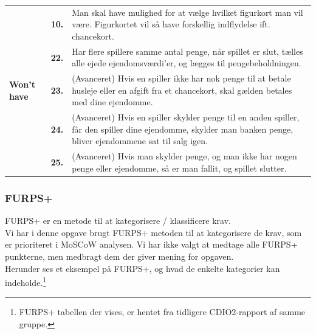      \begin{center}
        \begin{tabular}{ || p{2.5cm} | p{.4cm} | p{12.4cm} ||}
    \hline
    \hline
    &
    \textbf{10.}
    &
    Man skal have mulighed for at vælge hvilket figurkort man vil være.
    Figurkortet vil så have forskellig indflydelse ift. chancekort. 
    \\

    \cline{2-3}
    &
    \textbf{22.}
    &
    Har flere spillere samme antal penge, når spillet er slut, tælles alle ejede ejendomsværdi'er, og lægges til pengebeholdningen. \\

    \cline{2-3}
    \textbf{Won't have}
    &
    \textbf{23.}
    &
    (Avanceret) Hvis en spiller ikke har nok penge til at betale husleje eller en afgift fra et chancekort, skal gælden betales med dine ejendomme.
    \\

    \cline{2-3}
    &
    \textbf{24.}
    &
    (Avanceret) Hvis en spiller skylder penge til en anden spiller, får den spiller dine ejendomme, skylder man banken penge, bliver ejendommene sat til salg igen.
    \\

    \cline{2-3}
    &
    \textbf{25.}
    &
    (Avanceret) Hvis man skylder penge, og man ikke har nogen penge eller ejendomme, så er man fallit, og spillet slutter. \\
    \hline
    \hline
    \end{tabular}
\end{center}

\subsubsection{FURPS+}

FURPS+ er en metode til at kategorisere / klassificere krav. \\
Vi har i denne opgave brugt FURPS+ metoden til at kategorisere de krav, som er prioriteret i MoSCoW analysen.
Vi har ikke valgt at medtage alle FURPS+ punkterne, men medbragt dem der giver mening for opgaven. \\
Herunder ses et eksempel på FURPS+, og hvad de enkelte kategorier kan indeholde.\footnote{FURPS+ tabellen der vises, er hentet fra tidligere CDIO2-rapport af samme gruppe.}

